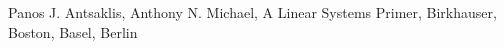 \documentclass[12pt]{article}
\begin{document}
\newpage
\begin{thebibliography}{1}

    Panos J. Antsaklis, Anthony N. Michael,
    A Linear Systems Primer,
    Birkhauser, Boston, Basel, Berlin
\end{thebibliography}
\end{document}
